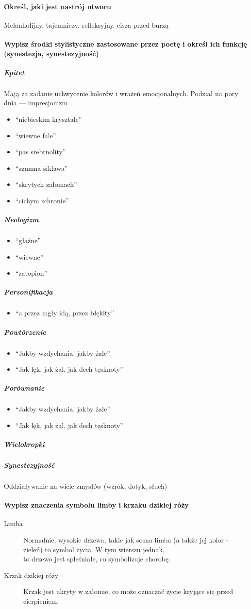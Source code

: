 \documentclass[a4paper]{article}
\begin{document}
\paragraph{Określ, jaki jest nastrój utworu}
Melanholijny, tajemniczy, refleksyjny, cisza przed burzą
\paragraph{Wypisz środki stylistyczne zastosowane przez poetę i określ ich funkcję (synestezja, synestezyjność)}
\subparagraph{Epitet}
Mają za zadanie uchwycenie kolorów i wrażeń emocjonalnych. Podział na pory dnia --- impresjonizm
\begin{itemize}
    \item ``niebieskim krysztale''
    \item ``wiewne fale''
    \item ``pas srebrnolity''
    \item ``szumna siklawa''
    \item ``skrytych załomach''
    \item ``cichym schronie''
\end{itemize}
\subparagraph{Neologizm}
\begin{itemize}
    \item ``głaźne''
    \item ``wiewne''
    \item ``zatopion''
\end{itemize}
\subparagraph{Personifikacja}
\begin{itemize}
    \item ``a przez mgły idą, przez błękity''
\end{itemize}
\subparagraph{Powtórzenie}
\begin{itemize}
    \item ``Jakby wzdychania, jakby żale''
    \item ``Jak lęk, jak żal, jak dech tęsknoty''
\end{itemize}
\subparagraph{Porównanie}
\begin{itemize}
    \item ``Jakby wzdychania, jakby żale''
    \item ``Jak lęk, jak żal, jak dech tęsknoty''
\end{itemize}
\subparagraph{Wielokropki}
\subparagraph{Synestezyjność}
Oddziaływanie na wiele zmysłów (wzrok, dotyk, słuch)

\paragraph{Wypisz znaczenia symbolu limby i krzaku dzikiej róży}
\begin{description}
    \item[Limba] Normalnie, wysokie drzewa, takie jak sosna limba (a także jej kolor - zieleń) to symbol życia. W tym wierszu jednak, \\
to drzewo jest spleśniałe, co symbolizuje chorobę.
    \item[Krzak dzikiej róży] Krzak jest ukryty w załomie, co może oznaczać życie kryjące się przed cierpieniem.
\end{description}
\end{document}
